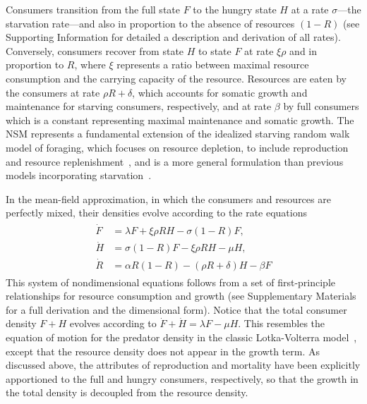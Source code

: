 \documentclass{pnastwo}
\begin{document}
\begin{article}
Consumers transition from the full state $F$ to the hungry state $H$ at a rate $\sigma$---the starvation rate---and also in proportion to the absence of resources $(1-R)$  (see Supporting Information for detailed a description and derivation of all rates).  Conversely, consumers recover from state $H$ to state $F$ at rate $\xi \rho$ and in proportion to $R$, where $\xi$ represents a ratio between maximal resource consumption and the carrying capacity of the resource. %
Resources are eaten by the consumers at rate $\rho R + \delta$, which accounts for somatic growth and maintenance for starving consumers, respectively, and at rate $\beta$ by full consumers which is a constant representing maximal maintenance and somatic growth.
The NSM represents a fundamental extension of the idealized starving random walk model of foraging, which focuses on resource depletion, to include reproduction and resource replenishment~\cite{Benichou:2014wu,Benichou:2016wl,Chupeau:2016jf}, and is a more general formulation than previous models incorporating starvation~\cite{Persson:1998hz}.

In the mean-field approximation, in which the consumers and resources are perfectly mixed, their densities evolve according to the rate equations
\begin{align}
\label{eq:system}
\begin{split}
\dot{F} &= \lambda F + \xi \rho RH - \sigma \left(1-R\right)F,  \\
\dot{H} &= \sigma \left(1-R\right)F - \xi \rho RH - \mu H,  \\
\dot{R} &= \alpha R\left(1-R\right) -\left(\rho R+\delta\right)H-\beta F
\end{split}
\end{align}
This system of nondimensional equations follows from a set of first-principle relationships for resource consumption and growth (see Supplementary Materials for a full derivation and the dimensional form).
Notice that the total consumer density $F+H$ evolves according to $\dot{F}+\dot{H}=\lambda F-\mu H$.
This resembles the equation of motion for the predator density in the classic Lotka-Volterra model~\cite{murray2011mathematical}, except that the resource density does not appear in the growth term.
As discussed above, the attributes of reproduction and mortality have been explicitly apportioned to the full and hungry consumers, respectively, so that the growth in the total density is decoupled from the resource density.


\end{article}
\end{document}
